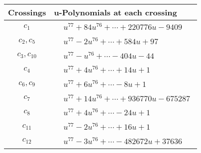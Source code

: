 \documentclass[1p]{elsarticle_modified}
\theoremstyle{definition}
\begin{document}
\begin{tabular}{m{50pt}|m{274pt}}
Crossings & \hspace{64pt}u-Polynomials at each crossing \\
\hline $$\begin{aligned}c_{1}\end{aligned}$$&$\begin{aligned}
&u^{77}+84 u^{76}+\cdots+220776 u-9409
\end{aligned}$\\
\hline $$\begin{aligned}c_{2},c_{5}\end{aligned}$$&$\begin{aligned}
&u^{77}-2 u^{76}+\cdots+584 u+97
\end{aligned}$\\
\hline $$\begin{aligned}c_{3},c_{10}\end{aligned}$$&$\begin{aligned}
&u^{77}- u^{76}+\cdots-404 u-44
\end{aligned}$\\
\hline $$\begin{aligned}c_{4}\end{aligned}$$&$\begin{aligned}
&u^{77}+4 u^{76}+\cdots+14 u+1
\end{aligned}$\\
\hline $$\begin{aligned}c_{6},c_{9}\end{aligned}$$&$\begin{aligned}
&u^{77}+6 u^{76}+\cdots-8 u+1
\end{aligned}$\\
\hline $$\begin{aligned}c_{7}\end{aligned}$$&$\begin{aligned}
&u^{77}+14 u^{76}+\cdots+936770 u-675287
\end{aligned}$\\
\hline $$\begin{aligned}c_{8}\end{aligned}$$&$\begin{aligned}
&u^{77}+4 u^{76}+\cdots-24 u+1
\end{aligned}$\\
\hline $$\begin{aligned}c_{11}\end{aligned}$$&$\begin{aligned}
&u^{77}-2 u^{76}+\cdots+16 u+1
\end{aligned}$\\
\hline $$\begin{aligned}c_{12}\end{aligned}$$&$\begin{aligned}
&u^{77}-3 u^{76}+\cdots-482672 u+37636
\end{aligned}$\\
\hline
\end{tabular}\\~\\
\end{document}
